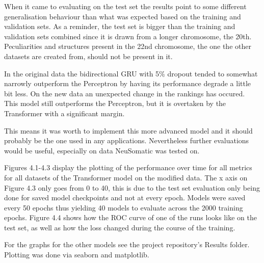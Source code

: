 \documentclass[bsc,frontabs,singlespacing,parskip,deptreport]{infthesis}
\begin{document}
When it came to evaluating on the test set the results point to some different generalisation behaviour than what was expected based on the training and validation sets. As a reminder, the test set is bigger than the training and validation sets combined since it is drawn from a longer chromosome, the 20th. Peculiarities and structures present in the 22nd chromosome, the one the other datasets are created from, should not be present in it.

In the original data the bidirectional GRU with 5\% dropout tended to somewhat narrowly outperform the Perceptron by having its performance degrade a little bit less. On the new data an unexpected change in the rankings has occured. This model still outperforms the Perceptron, but it is overtaken by the Transformer with a significant margin.

This means it was worth to implement this more advanced model and it should probably be the one used in any applications. Nevertheless further evaluations would be useful, especially on data NeuSomatic \cite{neusomatic} was tested on.

Figures 4.1-4.3 display the plotting of the performance over time for all metrics for all datasets of the Transformer model on the modified data. The x axis on Figure 4.3 only goes from 0 to 40, this is due to the test set evaluation only being done for saved model checkpoints and not at every epoch. Models were saved every 50 epochs thus yielding 40 models to evaluate across the 2000 training epochs. Figure 4.4 shows how the ROC curve of one of the runs looks like on the test set, as well as how the loss changed during the course of the training. 

For the graphs for the other models see the project repository's Results folder. Plotting was done via seaborn and matplotlib.
\end{document}
